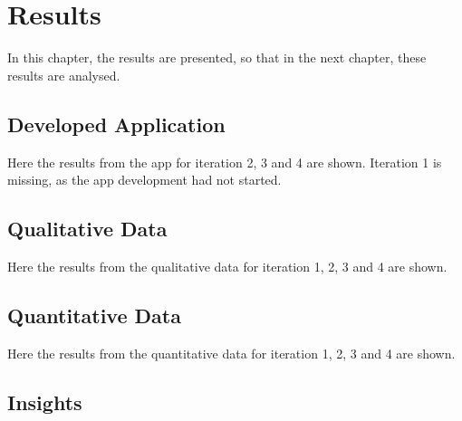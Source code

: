 \chapter{Results}\label{cha:Research}
%


In this chapter, the results are presented, so that in the next chapter, these results are analysed.

%

\section{Developed Application}

  Here the results from the app for iteration 2, 3 and 4 are shown. Iteration 1 is missing, as the app development had not started.

  
  
  
  

\section{Qualitative Data}

  Here the results from the qualitative data for iteration 1, 2, 3 and 4 are shown.

  
  
  
  

\section{Quantitative Data}

  Here the results from the quantitative data for iteration 1, 2, 3 and 4 are shown.

  
  
  
  

\section{Insights}

  
  
  
  


%

